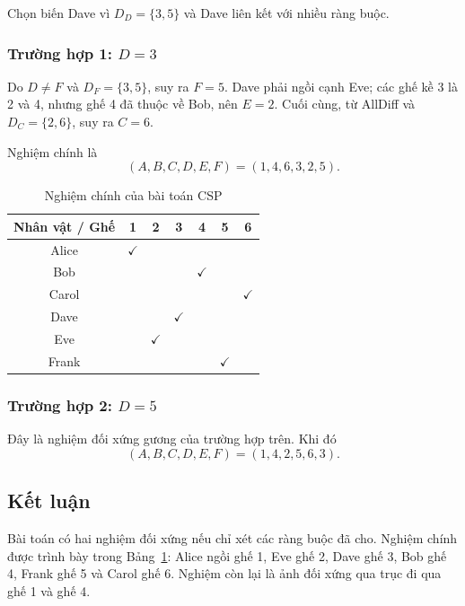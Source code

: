 Chọn biến Dave vì $D_D=\{3,5\}$ và Dave liên kết với nhiều ràng buộc.

\subsubsection{Trường hợp 1: $D=3$}

Do $D\ne F$ và $D_F=\{3,5\}$, suy ra $F=5$. Dave phải ngồi cạnh Eve;
các ghế kề 3 là 2 và 4, nhưng ghế 4 đã thuộc về Bob, nên $E=2$. Cuối
cùng, từ AllDiff và $D_C=\{2,6\}$, suy ra $C=6$.

Nghiệm chính là
\[
    (A,B,C,D,E,F)=(1,4,6,3,2,5).
\]

\begin{table}[htbp]
    \centering
    \caption{Nghiệm chính của bài toán CSP}
    \label{tab:nghiem-csp}
    \renewcommand{\arraystretch}{1.25}
    \begin{tabular}{c|cccccc}
        \toprule
        Nhân vật / Ghế & 1 & 2 & 3 & 4 & 5 & 6 \\
        \midrule
        Alice & $\checkmark$ &  &  &  &  &  \\
        Bob   &  &  &  & $\checkmark$ &  &  \\
        Carol &  &  &  &  &  & $\checkmark$ \\
        Dave  &  &  & $\checkmark$ &  &  &  \\
        Eve   &  & $\checkmark$ &  &  &  &  \\
        Frank &  &  &  &  & $\checkmark$ &  \\
        \bottomrule
    \end{tabular}
\end{table}

\subsubsection{Trường hợp 2: $D=5$}

Đây là nghiệm đối xứng gương của trường hợp trên. Khi đó
\[
    (A,B,C,D,E,F)=(1,4,2,5,6,3).
\]

\subsection{Kết luận}

Bài toán có hai nghiệm đối xứng nếu chỉ xét các ràng buộc đã cho. Nghiệm
chính được trình bày trong Bảng~\ref{tab:nghiem-csp}: Alice ngồi ghế 1,
Eve ghế 2, Dave ghế 3, Bob ghế 4, Frank ghế 5 và Carol ghế 6. Nghiệm còn
lại là ảnh đối xứng qua trục đi qua ghế 1 và ghế 4.

